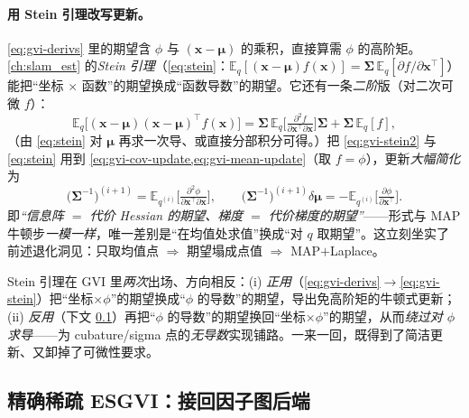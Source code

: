 \paragraph{用 Stein 引理改写更新。}
\cref{eq:gvi-derivs} 里的期望含 $\phi$ 与 $(\mathbf{x}-\boldsymbol{\mu})$ 的乘积，直接算需 $\phi$ 的高阶矩。\cref{ch:slam_est} 的\emph{Stein 引理}（\cref{eq:stein}：$\mathbb{E}_q[(\mathbf{x}-\boldsymbol{\mu})f(\mathbf{x})]=\boldsymbol{\Sigma}\,\mathbb{E}_q[\partial f/\partial\mathbf{x}^\top]$）能把“坐标 $\times$ 函数”的期望换成“函数导数”的期望。它还有一条\emph{二阶}版（对二次可微 $f$）：
\begin{equation}
  \mathbb{E}_q\big[(\mathbf{x}-\boldsymbol{\mu})(\mathbf{x}-\boldsymbol{\mu})^\top f(\mathbf{x})\big]
  =\boldsymbol{\Sigma}\,\mathbb{E}_q\!\Big[\tfrac{\partial^2 f}{\partial\mathbf{x}^\top\partial\mathbf{x}}\Big]\boldsymbol{\Sigma}+\boldsymbol{\Sigma}\,\mathbb{E}_q[f],
  \label{eq:gvi-stein2}
\end{equation}
（由 \cref{eq:stein} 对 $\boldsymbol{\mu}$ 再求一次导、或直接分部积分可得。）把 \cref{eq:gvi-stein2} 与 \cref{eq:stein} 用到 \cref{eq:gvi-cov-update,eq:gvi-mean-update}（取 $f=\phi$），更新\emph{大幅简化}为
\begin{equation}
  \boxed{\ \big(\boldsymbol{\Sigma}^{-1}\big)^{(i+1)}=\mathbb{E}_{q^{(i)}}\!\Big[\tfrac{\partial^2\phi}{\partial\mathbf{x}^\top\partial\mathbf{x}}\Big],\qquad
  \big(\boldsymbol{\Sigma}^{-1}\big)^{(i+1)}\delta\boldsymbol{\mu}=-\mathbb{E}_{q^{(i)}}\!\Big[\tfrac{\partial\phi}{\partial\mathbf{x}^\top}\Big].\ }
  \label{eq:gvi-stein}
\end{equation}
即\emph{“信息阵 $=$ 代价 Hessian 的期望、梯度 $=$ 代价梯度的期望”}——形式与 MAP 牛顿步\emph{一模一样}，唯一差别是“在均值处求值”换成“对 $q$ 取期望”。这立刻坐实了前述退化洞见：只取均值点 $\Rightarrow$ 期望塌成点值 $\Rightarrow$ MAP$+$Laplace。

\begin{insight}
Stein 引理在 GVI 里\emph{两次}出场、方向相反：(i) \emph{正用}（\cref{eq:gvi-derivs}$\to$\cref{eq:gvi-stein}）把“坐标$\times\phi$”的期望换成“$\phi$ 的导数”的期望，导出免高阶矩的牛顿式更新；(ii) \emph{反用}（下文 \cref{sec:nlopt-gvi-sparse}）再把“$\phi$ 的导数”的期望换回“坐标$\times\phi$”的期望，从而\emph{绕过对 $\phi$ 求导}——为 cubature/sigma 点的\emph{无导数}实现铺路。一来一回，既得到了简洁更新、又卸掉了可微性要求。
\end{insight}

\subsection{精确稀疏 ESGVI：接回因子图后端}
\label{sec:nlopt-gvi-sparse}


